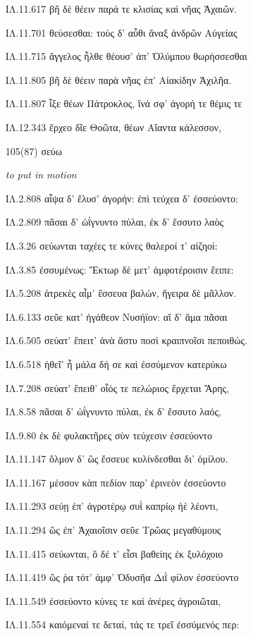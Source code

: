 \begin{enumerate}
{ΙΛ.11.617 βῆ δὲ θέειν παρά τε κλισίας καὶ νῆας Ἀχαιῶν.

ΙΛ.11.701 θεύσεσθαι: τοὺς δ' αὖθι ἄναξ ἀνδρῶν Αὐγείας

ΙΛ.11.715 ἄγγελος ἦλθε θέουσ' ἀπ' Ὀλύμπου θωρήσσεσθαι

ΙΛ.11.805 βῆ δὲ θέειν παρὰ νῆας ἐπ' Αἰακίδην Ἀχιλῆα.

ΙΛ.11.807 ἷξε θέων Πάτροκλος, ἵνά σφ' ἀγορή τε θέμις τε

ΙΛ.12.343 ἔρχεο δῖε Θοῶτα, θέων Αἴαντα κάλεσσον,

}

\clearpage
\item[\large 105(87)]{\large \g σεύω}

\hspace{0.2cm} \textit{ to put in motion }

{\g
ΙΛ.2.808 αἶψα δ' ἔλυσ' ἀγορήν: ἐπὶ τεύχεα δ' ἐσσεύοντο:

ΙΛ.2.809 πᾶσαι δ' ὠΐγνυντο πύλαι, ἐκ δ' ἔσσυτο λαὸς

ΙΛ.3.26 σεύωνται ταχέες τε κύνες θαλεροί τ' αἰζηοί:

ΙΛ.3.85 ἐσσυμένως: Ἕκτωρ δὲ μετ' ἀμφοτέροισιν ἔειπε:

ΙΛ.5.208 ἀτρεκὲς αἷμ' ἔσσευα βαλών, ἤγειρα δὲ μᾶλλον.

ΙΛ.6.133 σεῦε κατ' ἠγάθεον Νυσήϊον: αἳ δ' ἅμα πᾶσαι

ΙΛ.6.505 σεύατ' ἔπειτ' ἀνὰ ἄστυ ποσὶ κραιπνοῖσι πεποιθώς.

ΙΛ.6.518 ἠθεῖ' ἦ μάλα δή σε καὶ ἐσσύμενον κατερύκω

ΙΛ.7.208 σεύατ' ἔπειθ' οἷός τε πελώριος ἔρχεται Ἄρης,

ΙΛ.8.58 πᾶσαι δ' ὠΐγνυντο πύλαι, ἐκ δ' ἔσσυτο λαός,

ΙΛ.9.80 ἐκ δὲ φυλακτῆρες σὺν τεύχεσιν ἐσσεύοντο

ΙΛ.11.147 ὅλμον δ' ὣς ἔσσευε κυλίνδεσθαι δι' ὁμίλου.

ΙΛ.11.167 μέσσον κὰπ πεδίον παρ' ἐρινεὸν ἐσσεύοντο

ΙΛ.11.293 σεύῃ ἐπ' ἀγροτέρῳ συῒ καπρίῳ ἠὲ λέοντι,

ΙΛ.11.294 ὣς ἐπ' Ἀχαιοῖσιν σεῦε Τρῶας μεγαθύμους

ΙΛ.11.415 σεύωνται, ὃ δέ τ' εἶσι βαθείης ἐκ ξυλόχοιο

ΙΛ.11.419 ὥς ῥα τότ' ἀμφ' Ὀδυσῆα Διῒ φίλον ἐσσεύοντο

ΙΛ.11.549 ἐσσεύοντο κύνες τε καὶ ἀνέρες ἀγροιῶται,

ΙΛ.11.554 καιόμεναί τε δεταί, τάς τε τρεῖ ἐσσύμενός περ:

}
\end{enumerate}
